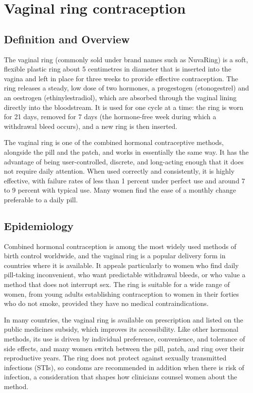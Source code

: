 \chapter{Vaginal ring contraception}

\section*{Definition and Overview}
The vaginal ring (commonly sold under brand names such as NuvaRing) is a soft, flexible plastic ring about 5 centimetres in diameter that is inserted into the vagina and left in place for three weeks to provide effective contraception. The ring releases a steady, low dose of two hormones, a progestogen (etonogestrel) and an oestrogen (ethinylestradiol), which are absorbed through the vaginal lining directly into the bloodstream. It is used for one cycle at a time: the ring is worn for 21 days, removed for 7 days (the hormone-free week during which a withdrawal bleed occurs), and a new ring is then inserted.

The vaginal ring is one of the combined hormonal contraceptive methods, alongside the pill and the patch, and works in essentially the same way. It has the advantage of being user-controlled, discrete, and long-acting enough that it does not require daily attention. When used correctly and consistently, it is highly effective, with failure rates of less than 1 percent under perfect use and around 7 to 9 percent with typical use. Many women find the ease of a monthly change preferable to a daily pill.

\section*{Epidemiology}
Combined hormonal contraception is among the most widely used methods of birth control worldwide, and the vaginal ring is a popular delivery form in countries where it is available. It appeals particularly to women who find daily pill-taking inconvenient, who want predictable withdrawal bleeds, or who value a method that does not interrupt sex. The ring is suitable for a wide range of women, from young adults establishing contraception to women in their forties who do not smoke, provided they have no medical contraindications.

In many countries, the vaginal ring is available on prescription and listed on the public medicines subsidy, which improves its accessibility. Like other hormonal methods, its use is driven by individual preference, convenience, and tolerance of side effects, and many women switch between the pill, patch, and ring over their reproductive years. The ring does not protect against sexually transmitted infections (STIs), so condoms are recommended in addition when there is risk of infection, a consideration that shapes how clinicians counsel women about the method.

